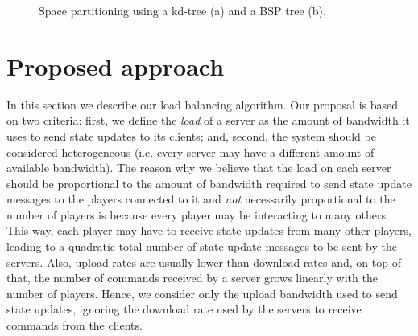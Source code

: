 \documentclass[acmjacm]{acmtrans2m}
\begin{document}
\begin{figure}[!t]
	\centering
	\caption{Space partitioning using a kd-tree (a) and a BSP tree (b).}
	\label{fig:bsp}
\end{figure}

\section{Proposed approach}
\label{sec:proposal}

In this section we describe our load balancing algorithm. Our proposal is based on two criteria: first, we define the \textit{load} of a server as the amount of bandwidth it uses to send state updates to its clients; and, second, the system should be considered heterogeneous (i.e. every server may have a different amount of available bandwidth). The reason why we believe that the load on each server should be proportional to the amount of bandwidth required to send state update messages to the players connected to it and \emph{not} necessarily proportional to the number of players is because every player may be interacting to many others. This way, each player may have to receive state updates from many other players, leading to a quadratic total number of state update messages to be sent by the servers. Also, upload rates are usually lower than download rates and, on top of that, the number of commands received by a server grows linearly with the number of players. Hence, we consider only the upload bandwidth used to send state updates, ignoring the download rate used by the servers to receive commands from the clients.
\end{document}
